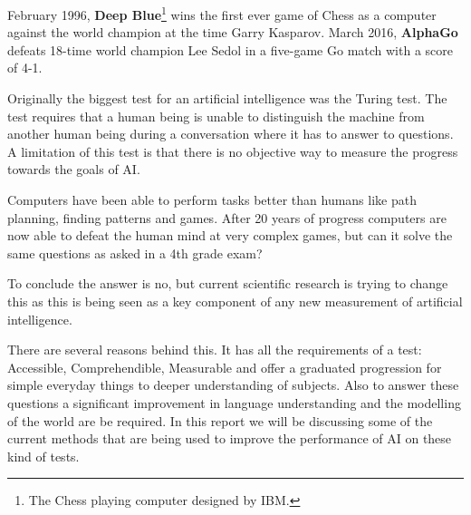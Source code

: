 February 1996, \textbf{Deep Blue}\footnote{The Chess playing computer designed by IBM.} wins the first ever game of Chess as a computer against the world champion at the time Garry Kasparov.
March 2016, \textbf{AlphaGo} defeats 18-time world champion Lee Sedol in a five-game Go match with a score of 4-1.

Originally the biggest test for an artificial intelligence was the Turing test.
The test requires that a human being is unable to distinguish the machine from another human being during a conversation where it has to answer to questions.
A limitation of this test is that there is no objective way to measure the progress towards the goals of AI.

Computers have been able to perform tasks better than humans like path planning, finding patterns and games. After 20 years of progress computers are now able to defeat the human mind at very complex games, but can it solve the same questions as asked in a 4th grade exam?

To conclude the answer is no, but current scientific research is trying to change this as this is being seen as a key component of any new measurement of artificial intelligence.

There are several reasons behind this.
It has all the requirements of a test: Accessible, Comprehendible, Measurable and offer a graduated progression for simple everyday things to deeper understanding of subjects.
Also to answer these questions a significant improvement in language understanding and the modelling of the world are be required. In this report we will be discussing some of the current methods that are being used to improve the performance of AI on these kind of tests.